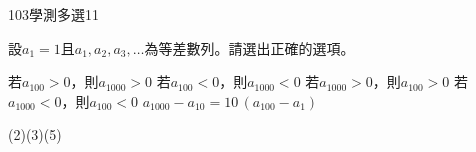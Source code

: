     \begin{QUESTION}
        \begin{ExamInfo}{103}{學測}{多選}{11}
        \end{ExamInfo}
        \begin{ExamAnsRateInfo}{50}{80}{50}{20}
        \end{ExamAnsRateInfo}
        \begin{QBODY}
            設${{a}_{1}}=1$且${{a}_{1}},{{a}_{2}},{{a}_{3}},\ldots $為等差數列。請選出正確的選項。
			\begin{QOPS}
				\QOP 若${{a}_{100}}>0$，則${{a}_{1000}}>0$
				\QOP 若${{a}_{100}}<0$，則${{a}_{1000}}<0$
				\QOP 若${{a}_{1000}}>0$，則${{a}_{100}}>0$
				\QOP 若${{a}_{1000}}<0$，則${{a}_{100}}<0$
				\QOP ${{a}_{1000}}-{{a}_{10}}=10\,({{a}_{100}}-{{a}_{1}})$
			\end{QOPS}
        \end{QBODY}
        \begin{QFROMS}
        \end{QFROMS}
        \begin{QTAGS}\end{QTAGS}
        \begin{QANS}
            (2)(3)(5)
        \end{QANS}
        \begin{QSOLLIST}
        \end{QSOLLIST}
        \begin{QEMPTYSPACE}
        \end{QEMPTYSPACE}
    \end{QUESTION}
